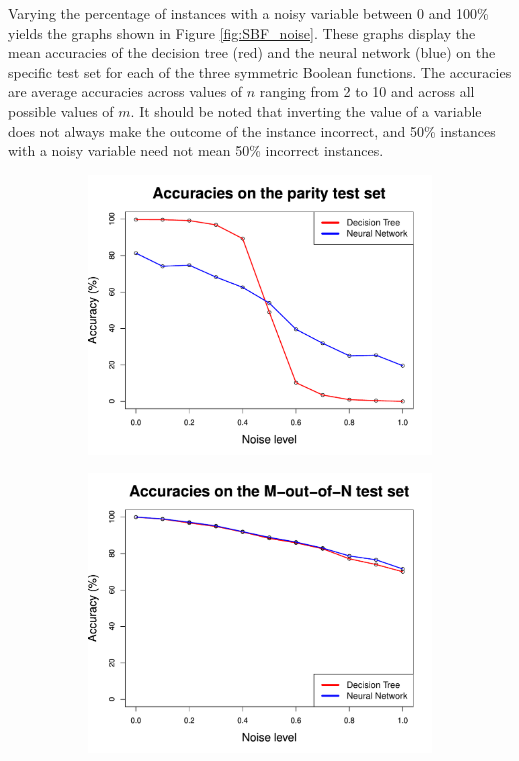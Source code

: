 \documentclass[letterpaper]{article} %
\begin{document}
Varying the percentage of instances with a noisy variable between 0 and 100\% yields the graphs shown in Figure \ref{fig:SBF_noise}. These graphs display the mean accuracies of the decision tree (red) and the neural network (blue) on the specific test set for each of the three symmetric Boolean functions.  The accuracies are average accuracies across values of $n$ ranging from 2 to 10 and across all possible values of $m$. It should be noted that inverting the value of a variable does not always make the outcome of the instance incorrect, and 50\% instances with a noisy variable need not mean 50\% incorrect instances.


  \begin{figure}[p]
    \centering
   \begin{subfigure}[t]{0.4\textwidth}
        \centering
        \includegraphics[width = 1 \linewidth]{Figures/SBF_PU.pdf}
        \caption{}
        \label{fig:SBF_PU}
    \end{subfigure}%

    \begin{subfigure}[t]{0.4\textwidth}
        \centering
        \includegraphics[width = 1 \linewidth]{Figures/SBF_MU.pdf}
        \caption{}
        \label{fig:SBF_MU}
    \end{subfigure}%


\end{figure}
\end{document}
